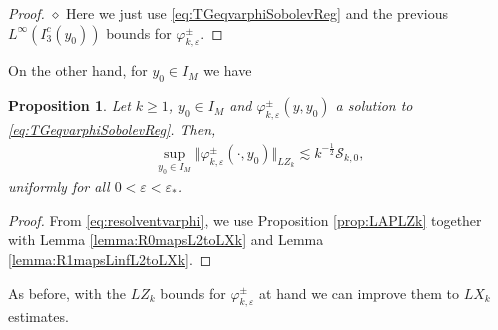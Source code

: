 \documentclass[11pt,reqno]{amsproc}
\newcommand{\diampar}[1]{\vspace{.5em}\noindent $\diamond$ \normalfont {\itshape #1.}}
\newtheorem{proposition}{Proposition}[section]
\theoremstyle{definition}
\numberwithin{equation}{section}
\newcommand{\cS}{{\mathcal S}}
\newcommand{\ep}{\varepsilon}
\begin{document}
\begin{proof}
\diampar{Proof for $n=2$} Here we just use \eqref{eq:TGeqvarphiSobolevReg} and the previous $L^\infty(I_3^c(y_0))$ bounds for $\varphi_{k,\ep}^\pm$.
\end{proof}

On the other hand, for $y_0\in I_M$ we have

\begin{proposition}\label{prop:LZkvarphi}
Let $k\geq 1$, $y_0\in I_M$ and $\varphi_{k,\ep}^\pm(y,y_0)$ a solution to \eqref{eq:TGeqvarphiSobolevReg}. Then,
\begin{align*}
\sup_{y_0\in I_M}\Vert \varphi_{k,\ep}^\pm(\cdot,y_0) \Vert_{LZ_k} \lesssim k^{-\frac12}\cS_{k,0}, 
\end{align*}
uniformly for all $0 < \ep< \ep_*$.
\end{proposition}

\begin{proof}
From \eqref{eq:resolventvarphi}, we use Proposition \ref{prop:LAPLZk} together with  Lemma \ref{lemma:R0mapsL2toLXk} and Lemma \ref{lemma:R1mapsLinfL2toLXk}.
\end{proof}

As before, with the $LZ_k$ bounds for $\varphi_{k,\ep}^\pm$ at hand we can improve them to $LX_k$ estimates.
\end{document}
